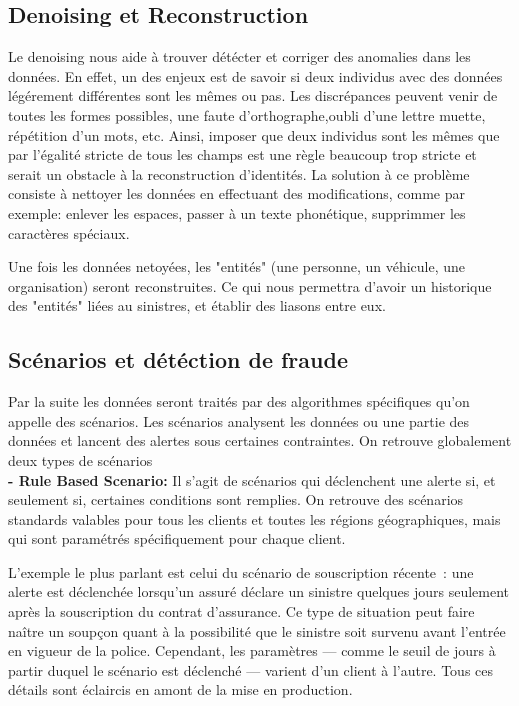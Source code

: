 \documentclass [twoside,openright,a4paper,11pt,french] {report}
\begin{document}
\subsection{Denoising et Reconstruction}

Le denoising nous aide à trouver détécter et corriger des anomalies dans les données. En effet, 
un des enjeux est de savoir si deux individus avec des données légérement différentes
sont les mêmes ou pas. Les discrépances peuvent venir de toutes les formes possibles,
une faute d'orthographe,oubli d'une lettre muette, répétition d'un mots, etc. Ainsi, 
imposer que deux individus sont les mêmes que par l'égalité stricte de tous les champs
est une règle beaucoup trop stricte et serait un obstacle à la reconstruction d'identités.
La solution à ce problème consiste à nettoyer les données en effectuant des modifications, comme 
par exemple: enlever les espaces, passer à un texte phonétique, supprimmer les 
caractères spéciaux.

Une fois les données netoyées, les "entités" (une personne, un véhicule, une organisation) seront reconstruites.
Ce qui nous permettra d'avoir un historique des "entités" liées au sinistres, et établir des liasons entre eux.

\subsection{Scénarios et détéction de fraude}

Par la suite les données seront traités par des algorithmes spécifiques qu'on appelle 
des scénarios. Les scénarios analysent les données ou une partie des données et lancent des alertes 
sous certaines contraintes.  On retrouve globalement deux types de scénarios\\

\textbf{- Rule Based Scenario: } Il s'agit de scénarios qui déclenchent une alerte si, et seulement si, certaines conditions sont remplies.  
On retrouve des scénarios standards valables pour tous les clients et toutes les régions géographiques, mais qui sont paramétrés spécifiquement pour chaque client.

L'exemple le plus parlant est celui du scénario de souscription récente~: une alerte est déclenchée lorsqu'un assuré déclare un sinistre quelques jours seulement 
après la souscription du contrat d'assurance.  
Ce type de situation peut faire naître un soupçon quant à la possibilité que le sinistre soit survenu avant l'entrée en vigueur de la police.  
Cependant, les paramètres — comme le seuil de jours à partir duquel le scénario est déclenché — varient d'un client à l'autre. Tous ces détails 
sont éclaircis en amont de la mise en production. 
\end{document}
